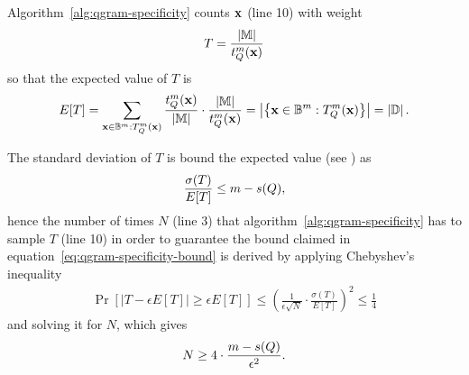 Algorithm~\ref{alg:qgram-specificity} counts $\mathbf{x}$ (line 10) with weight
\begin{eqnarray}
T = \frac{\left| \mathbb{M} \right|}{t_{Q}^{m}(\mathbf{x})}
\end{eqnarray}
so that the expected value of $T$ is
\begin{eqnarray}
E[T] = \sum_{\mathbf{x} \in \mathbb {B}^{m} : T_{Q}^{m}(\mathbf{x})}{\frac{t_{Q}^{m}(\mathbf{x})}{\left| \mathbb{M} \right|} \cdot \frac{\left| \mathbb{M} \right|}{t_{Q}^{m}(\mathbf{x})}} =
\left| \left\{ \mathbf{x} \in \mathbb {B}^{m} : T_{Q}^{m}(\mathbf{x}) \right\} \right| = \left| \mathbb{D} \right|.
\end{eqnarray}

The standard deviation of $T$ is bound \wrt the expected value (see \citep[chapter 28]{Vazirani2001}) as
\begin{eqnarray}
\frac{\sigma(T)}{E[T]} \leq m - s(Q),
\end{eqnarray}
hence the number of times $N$ (line 3) that algorithm~\ref{alg:qgram-specificity} has to sample $T$ (line 10) in order to guarantee the bound claimed in equation~\ref{eq:qgram-specificity-bound} is derived by applying Chebyshev's inequality
\begin{eqnarray}
\Pr \left[ \left| T - \epsilon E[T] \right| \geq \epsilon E[T] \right] \leq \left( \frac{1}{\epsilon \sqrt{N}} \cdot \frac{\sigma(T)}{E[T]} \right)^2 \leq \frac{1}{4}
\end{eqnarray}
and solving it for $N$, which gives
\begin{eqnarray}
N \geq 4 \cdot \frac{m - s(Q)}{\epsilon^2}.
\end{eqnarray}

